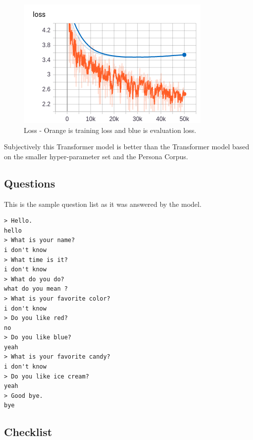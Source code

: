 \begin{figure}[H]
	\begin{center}
		\includegraphics[scale=3.5]{Figure_2}
		
		
	\end{center}
	\caption[Loss - Larger Transformer Model]{Loss - Orange is training loss and blue is evaluation loss.}
	
\end{figure}

Subjectively this Transformer model is better than the Transformer model based on the smaller hyper-parameter set and the Persona Corpus.


\subsection{Questions}
This is the sample question list as it was answered by the model.

\begin{verbatim}
> Hello.
hello 
> What is your name?
i don't know 
> What time is it?
i don't know 
> What do you do?
what do you mean ?
> What is your favorite color?
i don't know 
> Do you like red?
no 
> Do you like blue?
yeah 
> What is your favorite candy?
i don't know 
> Do you like ice cream?
yeah 
> Good bye.
bye 
\end{verbatim}

\subsection{Checklist}

